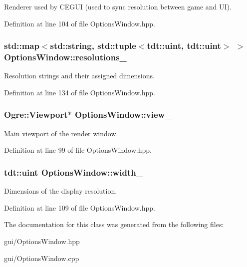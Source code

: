 Renderer used by C\+E\+G\+UI (used to sync resolution between game and UI). 



Definition at line 104 of file Options\+Window.\+hpp.

\subsubsection[{\texorpdfstring{resolutions\+\_\+}{resolutions_}}]{\setlength{\rightskip}{0pt plus 5cm}std\+::map$<$std\+::string, std\+::tuple$<$tdt\+::uint, tdt\+::uint$>$ $>$ Options\+Window\+::resolutions\+\_\+\hspace{0.3cm}{\ttfamily [private]}}\hypertarget{class_options_window_ae7e2ff101e41b90c0063b78710b85639}{}\label{class_options_window_ae7e2ff101e41b90c0063b78710b85639}


Resolution strings and their assigned dimensions. 



Definition at line 134 of file Options\+Window.\+hpp.

\subsubsection[{\texorpdfstring{view\+\_\+}{view_}}]{\setlength{\rightskip}{0pt plus 5cm}Ogre\+::\+Viewport$\ast$ Options\+Window\+::view\+\_\+\hspace{0.3cm}{\ttfamily [private]}}\hypertarget{class_options_window_a8c3609894e71264da13b88129d0a1f70}{}\label{class_options_window_a8c3609894e71264da13b88129d0a1f70}


Main viewport of the render window. 



Definition at line 99 of file Options\+Window.\+hpp.

\subsubsection[{\texorpdfstring{width\+\_\+}{width_}}]{\setlength{\rightskip}{0pt plus 5cm}tdt\+::uint Options\+Window\+::width\+\_\+\hspace{0.3cm}{\ttfamily [private]}}\hypertarget{class_options_window_ab5b2b96bd284265c5a49b145493e8ead}{}\label{class_options_window_ab5b2b96bd284265c5a49b145493e8ead}


Dimensions of the display resolution. 



Definition at line 109 of file Options\+Window.\+hpp.



The documentation for this class was generated from the following files\+:\begin{DoxyCompactItemize}
\item 
gui/Options\+Window.\+hpp\item 
gui/Options\+Window.\+cpp\end{DoxyCompactItemize}
